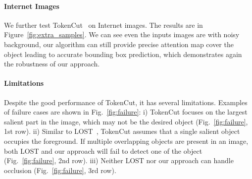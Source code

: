 \documentclass[twocolumn]{article}
\newcommand{\name} {TokenCut}
\begin{document}
\vspace{-10pt}
\paragraph{Internet Images} We further test \name~ on Internet images. The results are in Figure~\ref{fig:extra_samples}. We can see even the inputs images are with noisy background, our algorithm can still provide precise attention map cover the object leading to accurate bounding box prediction, which demonstrates again the robustness of our approach.

\paragraph{Limitations} 
Despite the good performance of TokenCut, it has several limitations. Examples of failure cases are shown in Fig.~\ref{fig:failure}: i)  TokenCut focuses on the largest salient part in the image, which may not be the desired object (Fig.~\ref{fig:failure}, 1st row). ii) Similar to LOST~\cite{simeoni2021localizing}, TokenCut assumes that a single salient object occupies the foreground. If multiple overlapping objects are present in an image, both LOST and our approach will fail to detect one of the object (Fig.~\ref{fig:failure}, 2nd row). iii) Neither LOST nor our approach can handle occlusion (Fig.~\ref{fig:failure}, 3rd row).  
\end{document}
